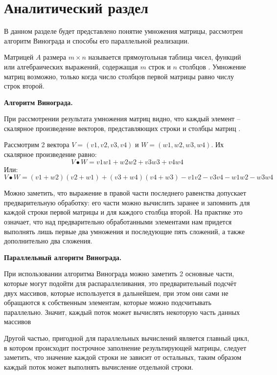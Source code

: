 \chapter{Аналитический раздел}
\label{cha:analysis}
В данном разделе будет представлено понятие умножения матрицы, рассмотрен алгоритм Винограда и способы его параллельной реализации.

\par Матрицей $A$ размера $m\times n$ называется прямоугольная таблица чисел, функций или алгебраических выражений, содержащая $m$ строк и $n$ столбцов \cite{Belousov}. Умножение матриц возможно, только когда число столбцов первой матрицы равно числу строк второй.

\par\textbf{Алгоритм Винограда.}
\par При рассмотрении результата умножения матриц видно, что каждый элемент -- скалярное произведение векторов, представляющих строки и столбцы матриц \cite{winograd}.
\par Рассмотрим 2 вектора $V = (v1, v2, v3, v4)$ и $W =(w1,w2,w3,w4)$. Их скалярное произведение равно:
\begin{equation}
	V\bullet W=v1w1+w2w2+v3w3+v4w4
\end{equation}
Или:
\begin{equation}
	V\bullet W=(v1+w2)(v2+w1)+(v3+w4)(v4+w3)-v1v2-v3v4-w1w2-w3w4
\end{equation}
\par Можно заметить, что выражение в правой части последнего равенства допускает предварительную обработку: его части можно вычислить заранее и запомнить для каждой строки первой матрицы и для каждого столбца второй. На практике это означает, что над предварительно обработанными элементами нам придется выполнять лишь первые два умножения и последующие пять сложений, а также дополнительно два сложения.

\par\textbf{Параллельный алгоритм Винограда.}
\par При использовании алгоритма Винограда можно заметить 2 основные части, которые могут подойти для распараллеливания, это предварительный подсчёт двух массивов, которые используется в дальнейшем, при этом они сами не обращаются к собственным элементам, которые можно подсчитывать параллельно. Значит, каждый поток может вычислять некоторую часть данных массивов
\par Другой частью, пригодной для параллельных вычислений является главный цикл, в котором происходит построчное заполнение результирующей матрицы, следует заметить, что значение каждой строки не зависит от остальных, таким образом каждый поток может выполнять вычисление отдельной строки.

